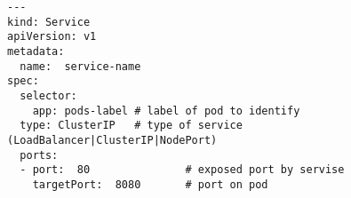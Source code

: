 \begin{lstfloat}
\begin{lstlisting}[style=mybashstyle,
caption={Ukázka reprezentace objektu SERVICE},
label={sample:service}
]
---
kind: Service
apiVersion: v1
metadata:
  name:  service-name
spec:
  selector:
    app: pods-label # label of pod to identify 
  type: ClusterIP   # type of service (LoadBalancer|ClusterIP|NodePort)
  ports:
  - port:  80               # exposed port by servise
    targetPort:  8080       # port on pod
\end{lstlisting}
\end{lstfloat}